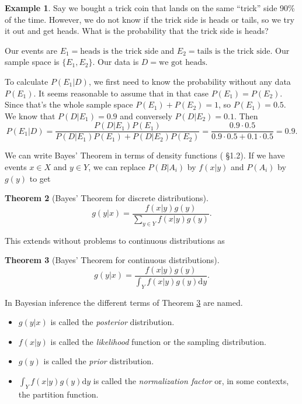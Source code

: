 \documentclass[12pt,vu]{adammath}
\newcommand\ddfrac[2]{\frac{\displaystyle #1}{\displaystyle #2}}
\theoremstyle{plain}
\newtheorem{theorem}{Theorem}[chapter]
\theoremstyle{definition}
\newtheorem{example}[theorem]{Example}
\theoremstyle{remark}
\begin{document}
\begin{mybox}
\begin{example}\label{discexample}
Say we bought a trick coin that lands on the same ``trick'' side 90\% of the time.
However, we do not know if the trick side is heads or tails, so we try it out and get heads.
What is the probability that the trick side is heads?

Our events are $E_1 = \text{heads is the trick side}$ and $E_2 = \text{tails is the trick side}$.
Our sample space is $\{ E_1, E_2 \}$.
Our data is $D = \text{we got heads}$.

To calculate $P(E_1 | D)$, we first need to know the probability without any data $P(E_1)$.
It seems reasonable to assume that in that case $P(E_1) = P(E_2)$.
Since that's the whole sample space $P(E_1) + P(E_2) = 1$, so $P(E_1) = 0.5$.
We know that $P(D | E_1) = 0.9$ and conversely $P(D | E_2) = 0.1$.
Then
$$P(E_1 | D) = \ddfrac{P(D | E_1) P(E_1)}{P(D | E_1) P(E_1) + P(D | E_2) P(E_2)} = \ddfrac{0.9 \cdot 0.5}{0.9 \cdot 0.5 + 0.1 \cdot 0.5} = 0.9.$$
\end{example}
\end{mybox}

We can write Bayes' Theorem in terms of density functions (\cite{bayesianchoice} \S 1.2).
If we have events $x \in X$ and $y \in Y$, we can replace $P(B|A_i)$ by $f(x | y)$ and $P(A_i)$ by $g(y)$ to get
\begin{theorem}[Bayes' Theorem for discrete distributions]
$$g(y|x) = \ddfrac{f(x | y) g(y)}{\sum_{y \in Y} f(x|y) g(y)}.$$
\end{theorem}

This extends without problems to continuous distributions as
\begin{theorem}[Bayes' Theorem for continuous distributions]\label{eq:bayescont}
$$g(y|x) = \ddfrac{f(x | y) g(y)}{\int_Y f(x|y) g(y) \mathrm{d}y}.$$
\end{theorem}

In Bayesian inference the different terms of Theorem \ref{eq:bayescont} are named.
\begin{itemize}
\item $g(y|x)$ is called the \emph{posterior} distribution.
\item $f(x | y)$ is called the \emph{likelihood} function or the sampling distribution.
\item $g(y)$ is called the \emph{prior} distribution.
\item $\int_Y f(x|y) g(y) \mathrm{d}y$ is called the \emph{normalization factor} or, in some contexts, the partition function.
\end{itemize}
\end{document}
